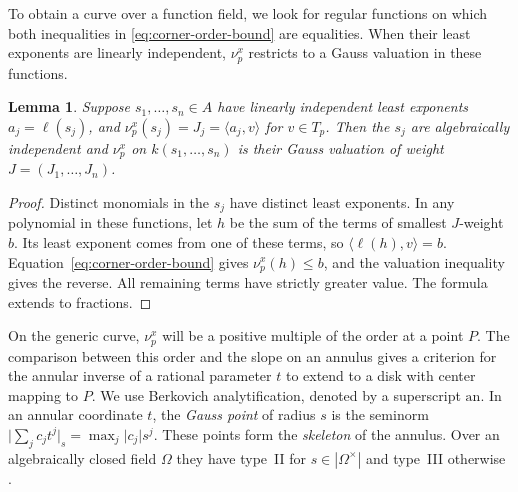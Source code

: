 \documentclass[11pt,reqno]{amsart}
\numberwithin{equation}{section}
\newtheorem{lemma}[theorem]{Lemma}
\theoremstyle{definition}
\theoremstyle{remark}
\begin{document}
To obtain a curve over a function field, we look for regular functions
on which both inequalities in \eqref{eq:corner-order-bound} are
equalities. When their least exponents are linearly independent,
\(\nu^x_p\) restricts to a Gauss valuation in these functions.

\begin{lemma}\label{lem:corner-gauss-subfield}
Suppose \(s_1,\ldots,s_n\in A\) have linearly independent least
exponents \(a_j=\ell(s_j)\), and \(\nu^x_p(s_j)=J_j=\langle a_j,v\rangle\)
for \(v\in T_p\). Then the \(s_j\) are algebraically independent
and \(\nu^x_p\) on \(k(s_1,\ldots,s_n)\) is their Gauss valuation
of weight \(J=(J_1,\ldots,J_n)\).
\end{lemma}
\begin{proof}
Distinct monomials in the \(s_j\) have distinct least exponents.
In any polynomial in these functions, let \(h\) be the sum of the
terms of smallest \(J\)-weight \(b\). Its least exponent comes from
one of these terms, so \(\langle\ell(h),v\rangle=b\).
Equation~\eqref{eq:corner-order-bound} gives \(\nu^x_p(h)\le b\),
and the valuation inequality gives the reverse. All remaining terms
have strictly greater value. The formula extends to fractions.
\end{proof}

On the generic curve, \(\nu^x_p\) will be a positive multiple of the
order at a point \(P\). The comparison between this order and the
slope on an annulus gives a criterion for the annular inverse of
a rational parameter \(t\) to extend to a disk with center mapping to \(P\).
We use Berkovich analytification, denoted by a superscript
\(\mathrm{an}\). In an annular coordinate \(t\), the \emph{Gauss point}
of radius \(s\) is the seminorm
\(\lvert\sum_j c_jt^j\rvert_s=\max_j\lvert c_j\rvert s^j\).
These points form the \emph{skeleton} of the annulus. Over an
algebraically closed field \(\Omega\) they have type~II for
\(s\in|\Omega^\times|\) and type~III otherwise
\cite[\S2]{BPR}.
\end{document}
